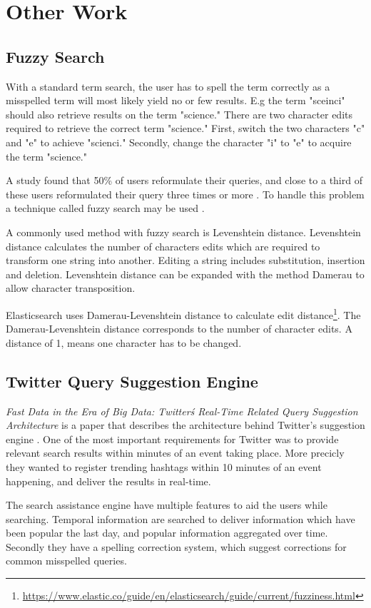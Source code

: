 \section{Other Work}

\subsection{Fuzzy Search}
With a standard term search, the user has to spell the term correctly as a misspelled term will most likely yield no or few results.
E.g the term "sceinci" should also retrieve results on the term "science."
There are two character edits required to retrieve the correct term "science."
First, switch the two characters "c" and "e" to achieve "scienci."
Secondly, change the character "i" to "e" to acquire the term "science."

A study found that 50\% of users reformulate their queries, and close to a third of these users reformulated their query three times or more \cite{query-reformulate}.
To handle this problem a technique called fuzzy search may be used \cite{fuzzy-search}.

A commonly used method with fuzzy search is Levenshtein distance.
Levenshtein distance calculates the number of characters edits which are required to transform one string into another.
Editing a string includes substitution, insertion and deletion.
Levenshtein distance can be expanded with the method Damerau to allow character transposition.

Elasticsearch uses Damerau-Levenshtein distance to calculate edit distance\footnote{\url{https://www.elastic.co/guide/en/elasticsearch/guide/current/fuzziness.html}}.
The Damerau-Levenshtein distance corresponds to the number of character edits.
A distance of 1, means one character has to be changed.

\subsection{Twitter Query Suggestion Engine}
\textit{Fast Data in the Era of Big Data: Twitter\'s Real-Time Related Query Suggestion Architecture} is a paper that describes the architecture behind Twitter's suggestion engine \cite{twitter-suggestion}.
One of the most important requirements for Twitter was to provide relevant search results within minutes of an event taking place.
More precicly they wanted to register trending hashtags within 10 minutes of an event happening, and deliver the results in real-time.

The search assistance engine have multiple features to aid the users while searching.
Temporal information are searched to deliver information which have been popular the last day, and popular information aggregated over time.
Secondly they have a spelling correction system, which suggest corrections for common misspelled queries.
